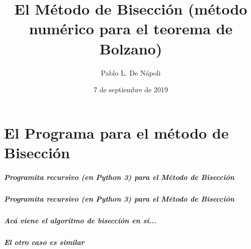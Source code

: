 \documentclass[11pt]{beamer}
\begin{document}
 
 

\title[Bisección]{El Método de Bisección (método numérico para el teorema de Bolzano) }
\author{Pablo L. De Nápoli}
\date{7 de septiembre de 2019}



\maketitle

\part{El Programa para el método de Bisección}

\frame{\partpage}
\begin{frame}
\frametitle{Programita recursivo (en Python 3) para el Método de
Bisección}


\frametitle{}



\end{frame}


\begin{frame} 

\frametitle{Programita recursivo (en Python 3) para el Método de
Bisección}


\frametitle{Acá viene el algoritmo de bisección en sí...}



\end{frame}
\begin{frame}


\frametitle{El otro caso es similar}



\end{frame}
\end{document}
